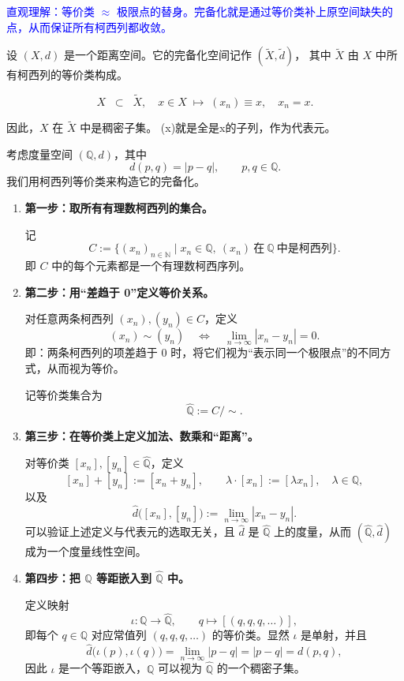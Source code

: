 \textcolor{blue}{直观理解：等价类 $\approx$ 极限点的替身。完备化就是通过等价类补上原空间缺失的点，从而保证所有柯西列都收敛。}
\begin{example}
    设 $(X,d)$ 是一个距离空间。它的完备化空间记作 $(\tilde{X}, \tilde{d})$，  
其中 $\tilde{X}$ 由 $X$ 中所有柯西列的等价类构成。  

\[
X \;\;\subset\;\; \tilde{X}, \quad 
x \in X \;\longmapsto\; (x_n) \equiv x, \quad x_n = x.
\]

因此，$X$ 在 $\tilde{X}$ 中是稠密子集。
(x)就是全是x的子列，作为代表元。
\end{example}
\begin{example}[有理数域的完备化]\label{ex:completion-Q}
考虑度量空间 $(\mathbb{Q},d)$，其中
\[
d(p,q)=|p-q|,\qquad p,q\in\mathbb{Q}.
\]
我们用柯西列等价类来构造它的完备化。

\begin{enumerate}
  \item \textbf{第一步：取所有有理数柯西列的集合。}

  记
  \[
    C := \bigl\{ (x_n)_{n\in\mathbb{N}} \mid x_n\in\mathbb{Q},\ (x_n)\ \text{在}\ \mathbb{Q}\ \text{中是柯西列} \bigr\}.
  \]
  即 $C$ 中的每个元素都是一个有理数柯西序列。
  
  \item \textbf{第二步：用“差趋于 0”定义等价关系。}

  对任意两条柯西列 $(x_n),(y_n)\in C$，定义
  \[
    (x_n)\sim (y_n)
    \quad\Longleftrightarrow\quad
    \lim_{n\to\infty}|x_n-y_n|=0.
  \]
  即：两条柯西列的项差趋于 $0$ 时，将它们视为“表示同一个极限点”的不同方式，从而视为等价。
  
  记等价类集合为
  \[
    \widehat{\mathbb{Q}} := C/\sim.
  \]

  \item \textbf{第三步：在等价类上定义加法、数乘和“距离”。}

  对等价类 $[x_n],[y_n]\in\widehat{\mathbb{Q}}$，定义
  \[
    [x_n]+[y_n] := [x_n+y_n],\qquad
    \lambda\cdot[x_n]:=[\lambda x_n],\quad \lambda\in\mathbb{Q},
  \]
  以及
  \[
    \widehat d\bigl([x_n],[y_n]\bigr)
    :=\lim_{n\to\infty} |x_n-y_n|.
  \]
  可以验证上述定义与代表元的选取无关，且 $\widehat d$ 是 $\widehat{\mathbb{Q}}$ 上的度量，从而 $(\widehat{\mathbb{Q}},\widehat d)$ 成为一个度量线性空间。

  \item \textbf{第四步：把 $\mathbb{Q}$ 等距嵌入到 $\widehat{\mathbb{Q}}$ 中。}

  定义映射
  \[
    \iota:\mathbb{Q}\longrightarrow\widehat{\mathbb{Q}},\qquad
    q\longmapsto [(q,q,q,\dots)],
  \]
  即每个 $q\in\mathbb{Q}$ 对应常值列 $(q,q,q,\dots)$ 的等价类。显然 $\iota$ 是单射，并且
  \[
    \widehat d\bigl(\iota(p),\iota(q)\bigr)
    =\lim_{n\to\infty}|p-q|
    =|p-q|=d(p,q),
  \]
  因此 $\iota$ 是一个等距嵌入，$\mathbb{Q}$ 可以视为 $\widehat{\mathbb{Q}}$ 的一个稠密子集。


\end{enumerate}
\end{example}
